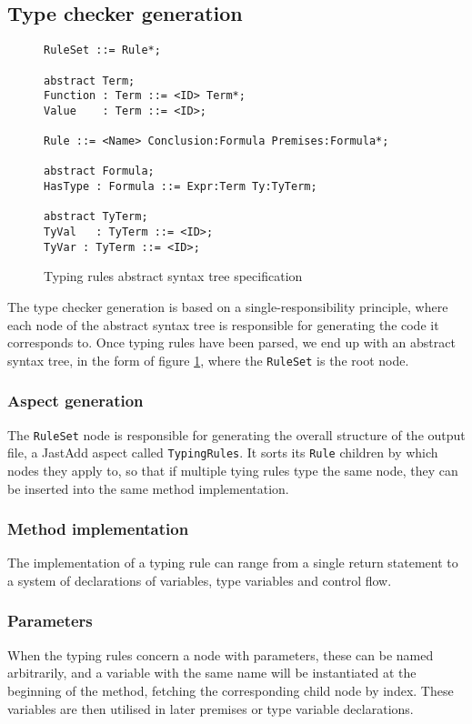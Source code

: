 \documentclass[nofilelist]{cslthse-msc}
\begin{document}
\subsection{Type checker generation}
\begin{figure}[h]
\begin{lstlisting}[]
RuleSet ::= Rule*;

abstract Term;
Function : Term ::= <ID> Term*;
Value    : Term ::= <ID>;

Rule ::= <Name> Conclusion:Formula Premises:Formula*;

abstract Formula;
HasType : Formula ::= Expr:Term Ty:TyTerm;

abstract TyTerm;
TyVal   : TyTerm ::= <ID>;
TyVar : TyTerm ::= <ID>;
\end{lstlisting}
  \caption{Typing rules abstract syntax tree specification}
  \label{trastspec}
\end{figure}

The type checker generation is based on a single-responsibility principle, where each node of the abstract syntax tree is responsible for generating the code it corresponds to.
Once typing rules have been parsed, we end up with an abstract syntax tree, in the form of figure \ref{trastspec}, where the \verb|RuleSet| is the root node.

\subsubsection{Aspect generation}
The \verb|RuleSet| node is responsible for generating the overall structure of the output file, a JastAdd aspect called \verb|TypingRules|.
It sorts its \verb|Rule| children by which nodes they apply to, so that if multiple tying rules type the same node, they can be inserted into the same method implementation.

\subsubsection{Method implementation}
The implementation of a typing rule can range from a single return statement to a system of declarations of variables, type variables and control flow.

\subsubsection{Parameters}
When the typing rules concern a node with parameters, these can be named arbitrarily, and a variable with the same name will be instantiated at the beginning of the method, fetching the corresponding child node by index.
These variables are then utilised in later premises or type variable declarations.
\end{document}
